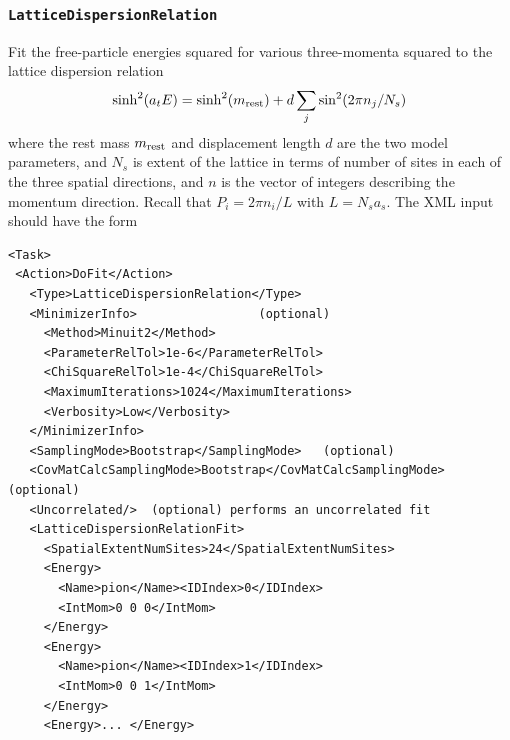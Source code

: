 \documentclass[12pt]{article}
\newcommand{\vb}{\texttt}
\begin{document}
\subsubsection{\vb{LatticeDispersionRelation}}

Fit the free-particle energies squared for various three-momenta squared
to the lattice dispersion relation
\[
     \sinh^2(a_t E) = \sinh^2(m_{\rm rest}) + d \sum_j \sin^2(2\pi n_j/N_s)
\]
where the rest mass $m_{\rm rest}$ and displacement length $d$ are the two model 
parameters, and $N_s$ is extent of the lattice in terms of number of sites
in each of the three spatial directions, and $n$ is the vector of integers 
describing the momentum direction. Recall that $P_i = 2\pi n_i/L$ with
$L=N_s a_s$.   The XML input should have the form
\begin{verbatim}
<Task>                                                                   
 <Action>DoFit</Action>                                                  
   <Type>LatticeDispersionRelation</Type>                                
   <MinimizerInfo>                 (optional)                            
     <Method>Minuit2</Method>                                            
     <ParameterRelTol>1e-6</ParameterRelTol>                             
     <ChiSquareRelTol>1e-4</ChiSquareRelTol>                             
     <MaximumIterations>1024</MaximumIterations>                         
     <Verbosity>Low</Verbosity>                                          
   </MinimizerInfo>                                                      
   <SamplingMode>Bootstrap</SamplingMode>   (optional)                   
   <CovMatCalcSamplingMode>Bootstrap</CovMatCalcSamplingMode> (optional) 
   <Uncorrelated/>  (optional) performs an uncorrelated fit              
   <LatticeDispersionRelationFit>                                        
     <SpatialExtentNumSites>24</SpatialExtentNumSites>                   
     <Energy>                                                            
       <Name>pion</Name><IDIndex>0</IDIndex>                             
       <IntMom>0 0 0</IntMom>                                            
     </Energy>                                                           
     <Energy>                                                            
       <Name>pion</Name><IDIndex>1</IDIndex>                             
       <IntMom>0 0 1</IntMom>                                            
     </Energy>                                                           
     <Energy>... </Energy>                                               

\end{verbatim}
\end{document}
